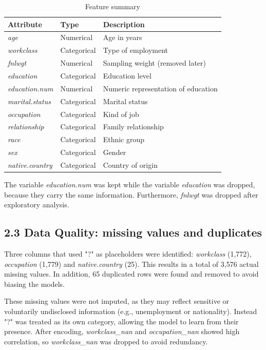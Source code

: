 \documentclass[a4paper,oneside,bibliography=totoc]{scrbook}
\begin{document}
\begin{table}[H]
	\centering
	\fontsize{10}{12}\selectfont
	\begin{tabular}{|l|l|l|}
		\hline \textbf{Attribute} & \textbf{Type} & \textbf{Description} \\
		\hline \textit{age} & Numerical & Age in years \\
		\hline \textit{workclass} & Categorical & Type of employment \\
		\hline \textit{fnlwgt} & Numerical & Sampling weight (removed later) \\
		\hline \textit{education} & Categorical & Education level \\
		\hline \textit{education.num} & Numerical & Numeric representation of education \\
		\hline \textit{marital.status} & Categorical & Marital status \\
		\hline \textit{occupation} & Categorical & Kind of job \\
		\hline \textit{relationship} & Categorical & Family relationship \\
		\hline \textit{race} & Categorical & Ethnic group \\
		\hline \textit{sex} & Categorical & Gender \\
		\hline \textit{native.country} & Categorical & Country of origin \\
		\hline
	\end{tabular}
	\caption{Feature summary}
	\label{tab:t1}
\end{table}

The variable \textit{education.num} was kept while the variable \textit{education} was dropped, because they carry the same information. Furthermore, \textit{fnlwgt} was dropped after exploratory analysis. 

\subsection*{2.3 Data Quality: missing values and duplicates}

Three columns that used "?" as placeholders were identified: \textit{workclass} (1,772), \textit{occupation} (1,779) and \textit{native.country} (25). This results in a total of 3,576 actual missing values. In addition, 65 duplicated rows were found and removed to avoid biasing the models.

These missing values were not imputed, as they may reflect sensitive or voluntarily undisclosed information (e.g., unemployment or nationality). Instead "?" was treated as its own category, allowing the model to learn from their presence. After encoding, \textit{workclass\_nan} and \textit{occupation\_nan} showed high correlation, so \textit{workclass\_nan} was dropped to avoid redundancy. 
\end{document}
